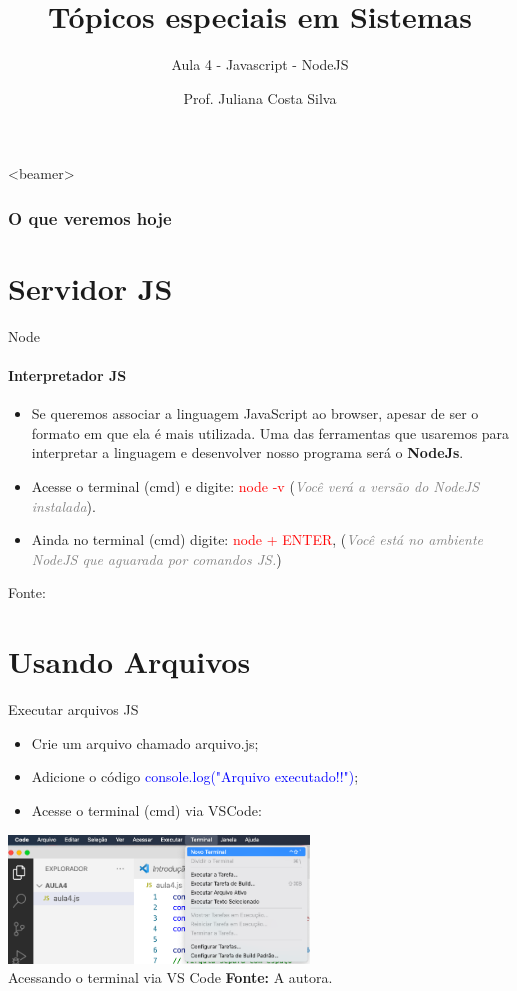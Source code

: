 \documentclass{beamer}
\title{Tópicos especiais em Sistemas}
\subtitle{Aula 4  - Javascript - NodeJS}
\author{Prof. Juliana Costa Silva}
\begin{document}
  \frame[c]{\maketitle}
    \begin{frame}<beamer>
      \frametitle{O que veremos hoje}
      \tableofcontents
    \end{frame}
    \section{Servidor JS}
    \begin{frame}{Node}
      \framesubtitle{Interpretador JS}%
      
      \begin{itemize}
            \item Se queremos associar a linguagem JavaScript ao browser, apesar de ser o formato em que ela é mais utilizada. Uma das ferramentas que usaremos para interpretar a linguagem e desenvolver nosso programa será o \textbf{NodeJs}.
            \item Acesse o terminal (cmd) e digite:  \textcolor{red}{node -v} (\textcolor{gray}{\textit{Você verá a versão do NodeJS instalada}}).
            \item Ainda no terminal (cmd) digite:  \textcolor{red}{node + ENTER}, (\textcolor{gray}{\textit{Você está no ambiente NodeJS que aguarada por comandos JS.}})
       \end{itemize}
       \tiny{Fonte: \cite{nodejs2022api}}
     \end{frame}
\section{Usando Arquivos}
\begin{frame}{Executar arquivos JS}

    \begin{itemize}
        \item Crie um arquivo chamado arquivo.js;
        \item Adicione o código \textcolor{blue}{console.log("Arquivo executado!!")};
        \item Acesse o terminal (cmd) via VSCode:  
    \end{itemize}
    \centering
	\includegraphics[width=80mm]{resources/aula_js_4_1.png}\\
            \tiny{ Acessando o terminal via VS Code \textbf{Fonte:} A autora.}
\end{frame}
\end{document}
